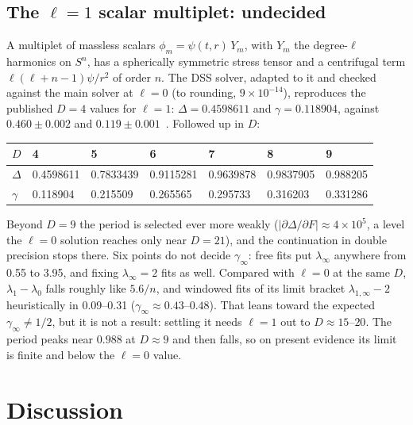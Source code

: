 \documentclass[aps,prd,onecolumn,superscriptaddress,nofootinbib,10pt]{revtex4-2}
\begin{document}
\subsection{The $\ell = 1$ scalar multiplet: undecided}

A multiplet of massless scalars $\phi_m = \psi(t,r)\,Y_m$, with $Y_m$ the degree-$\ell$ harmonics on $S^{n}$, has a
spherically symmetric stress tensor and a centrifugal term $\ell(\ell + n - 1)\psi/r^2$ of order $n$. The DSS solver,
adapted to it and checked against the main solver at $\ell = 0$ (to rounding, $9\times10^{-14}$), reproduces the published
$D = 4$ values for $\ell = 1$: $\Delta = 0.4598611$ and $\gamma = 0.118904$, against $0.460 \pm 0.002$ and
$0.119 \pm 0.001$~\cite{OlabarrietaEtAl2007}. Followed up in $D$:
\begin{center}
\small
\begin{tabular}{lllllll}
\toprule
$D$ & 4 & 5 & 6 & 7 & 8 & 9 \\ \hline
$\Delta$ & 0.4598611 & 0.7833439 & 0.9115281 & 0.9639878 & 0.9837905 & 0.988205 \\
$\gamma$ & 0.118904 & 0.215509 & 0.265565 & 0.295733 & 0.316203 & 0.331286 \\
\bottomrule
\end{tabular}
\end{center}
Beyond $D = 9$ the period is selected ever more weakly ($|\partial\Delta/\partial F| \approx 4\times10^5$, a level the
$\ell = 0$ solution reaches only near $D = 21$), and the continuation in double precision stops there. Six points do not decide $\gamma_\infty$: free fits put
$\lambda_\infty$ anywhere from 0.55 to 3.95, and fixing $\lambda_\infty = 2$ fits as well. Compared with $\ell = 0$ at the
same $D$, $\lambda_1 - \lambda_0$ falls roughly like $5.6/n$, and windowed fits of its limit bracket $\lambda_{1,\infty} - 2$
heuristically in 0.09--0.31 ($\gamma_\infty \approx 0.43$--$0.48$). That leans toward the expected
$\gamma_\infty \ne 1/2$, but it is not a result: settling it needs $\ell = 1$ out to $D \approx 15$--$20$. The period peaks
near $0.988$ at $D \approx 9$ and then falls, so on present evidence its limit is finite and below the $\ell = 0$ value.

\section{Discussion}
\label{sec:discussion}
\end{document}

